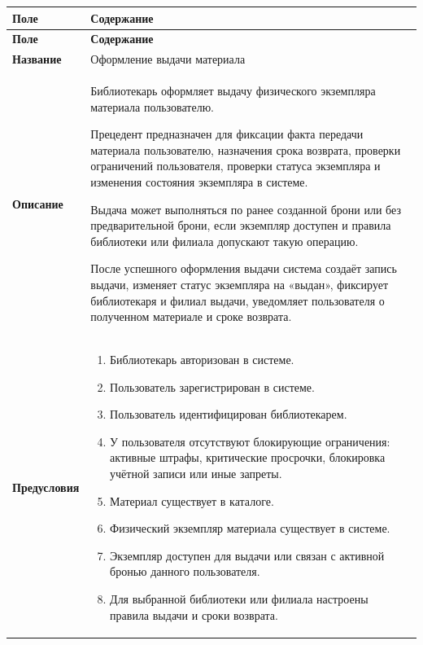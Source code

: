 \documentclass[12pt,a4paper]{article}
\begin{document}
		\begin{xltabular}{\textwidth}{
				|>{\raggedright\arraybackslash}p{2.7cm}
				|>{\raggedright\arraybackslash}X|
			}
			\hline
			\textbf{Поле} & \textbf{Содержание} \\
			\hline
			\endfirsthead
			
			\hline
			\textbf{Поле} & \textbf{Содержание} \\
			\hline
			\endhead
			
			\hline
			\endfoot
			
			\textbf{Название} &
			Оформление выдачи материала \\
			\hline
			
			\textbf{Описание} &
			Библиотекарь оформляет выдачу физического экземпляра материала
			пользователю.
			
			Прецедент предназначен для фиксации факта передачи материала
			пользователю, назначения срока возврата, проверки ограничений
			пользователя, проверки статуса экземпляра и изменения состояния
			экземпляра в системе.
			
			Выдача может выполняться по ранее созданной брони или без
			предварительной брони, если экземпляр доступен и правила библиотеки
			или филиала допускают такую операцию.
			
			После успешного оформления выдачи система создаёт запись выдачи,
			изменяет статус экземпляра на «выдан», фиксирует библиотекаря и
			филиал выдачи, уведомляет пользователя о полученном материале и
			сроке возврата. \\
			\hline
			
			\textbf{Предусловия} &
			\begin{enumerate}
				\item Библиотекарь авторизован в системе.
				\item Пользователь зарегистрирован в системе.
				\item Пользователь идентифицирован библиотекарем.
				\item У пользователя отсутствуют блокирующие ограничения:
				активные штрафы, критические просрочки, блокировка учётной записи
				или иные запреты.
				\item Материал существует в каталоге.
				\item Физический экземпляр материала существует в системе.
				\item Экземпляр доступен для выдачи или связан с активной бронью
				данного пользователя.
				\item Для выбранной библиотеки или филиала настроены правила выдачи
				и сроки возврата.
			\end{enumerate} \\
			\hline
			

\end{xltabular}
\end{document}
